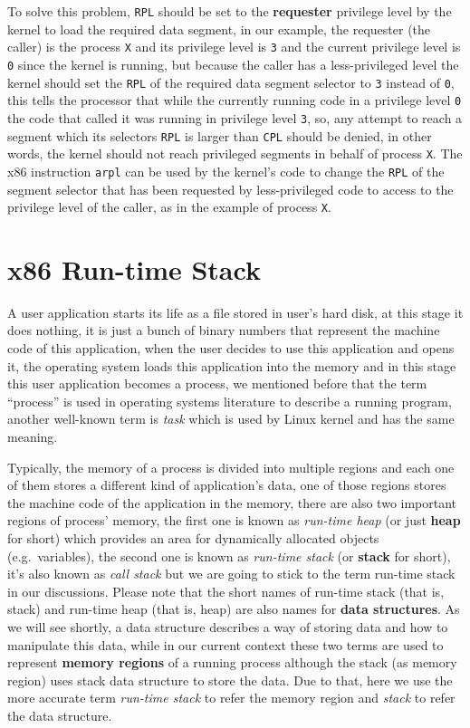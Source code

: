 To solve this problem, \lstinline!RPL! should be set to the
\textbf{requester} privilege level by the kernel to load the required
data segment, in our example, the requester (the caller) is the process
\lstinline!X! and its privilege level is \lstinline!3! and the current
privilege level is \lstinline!0! since the kernel is running, but
because the caller has a less-privileged level the kernel should set the
\lstinline!RPL! of the required data segment selector to \lstinline!3!
instead of \lstinline!0!, this tells the processor that while the
currently running code in a privilege level \lstinline!0! the code that
called it was running in privilege level \lstinline!3!, so, any attempt
to reach a segment which its selectors \lstinline!RPL! is larger than
\lstinline!CPL! should be denied, in other words, the kernel should not
reach privileged segments in behalf of process \lstinline!X!. The x86
instruction \lstinline!arpl! can be used by the kernel's code to change
the \lstinline!RPL! of the segment selector that has been requested by
less-privileged code to access to the privilege level of the caller, as
in the example of process \lstinline!X!.

\section{x86 Run-time Stack}\label{x86-run-time-stack}

A user application starts its life as a file stored in user's hard disk,
at this stage it does nothing, it is just a bunch of binary numbers that
represent the machine code of this application, when the user decides to
use this application and opens it, the operating system loads this
application into the memory and in this stage this user application
becomes a process, we mentioned before that the term ``process'' is used
in operating systems literature to describe a running program, another
well-known term is \emph{task} which is used by Linux kernel and has the
same meaning.

Typically, the memory of a process is divided into multiple regions and
each one of them stores a different kind of application's data, one of
those regions stores the machine code of the application in the memory,
there are also two important regions of process' memory, the first one
is known as \emph{run-time heap} (or just \textbf{heap} for short) which
provides an area for dynamically allocated objects (e.g.~variables), the
second one is known as \emph{run-time stack} (or \textbf{stack} for
short), it's also known as \emph{call stack} but we are going to stick
to the term run-time stack in our discussions. Please note that the
short names of run-time stack (that is, stack) and run-time heap (that
is, heap) are also names for \textbf{data structures}. As we will see
shortly, a data structure describes a way of storing data and how to
manipulate this data, while in our current context these two terms are
used to represent \textbf{memory regions} of a running process although
the stack (as memory region) uses stack data structure to store the
data. Due to that, here we use the more accurate term \emph{run-time
stack} to refer the memory region and \emph{stack} to refer the data
structure.

